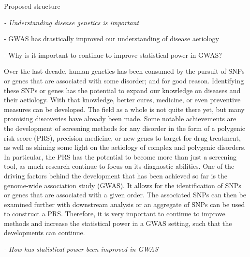 Proposed structure

{\itshape
- Understanding disease genetics is important

- GWAS has drastically improved our understanding of disease aetiology

- Why is it important to continue to improve statistical power in GWAS?

}

Over the last decade, human genetics has been consumed by the pursuit of SNPs or genes that are associated with some disorder; and for good reason. Identifying these SNPs or genes has the potential to expand our knowledge on diseases and their aetiology. With that knowledge, better cures, medicine, or even preventive measures can be developed. The field as a whole is not quite there yet, but many promising discoveries have already been made. Some notable achievements are the development of screening methods for any disorder in the form of a polygenic risk score (PRS), precision medicine, or new genes to target for drug treatment, as well as shining some light on the aetiology of complex and polygenic disorders. In particular, the PRS has the potential to become more than just a screening tool, as much research continue to focus on its diagnostic abilities. One of the driving factors behind the development that has been achieved so far is the genome-wide association study (GWAS). It allows for the identification of SNPs or genes that are associated with a given order. The associated SNPs can then be examined further with downstream analysis or an aggregate of SNPs can be used to construct a PRS. Therefore, it is very important to continue to improve methods and increase the statistical power in a GWAS setting, such that the developments can continue.



{\itshape
	- How has statistical power been improved in GWAS 
}

